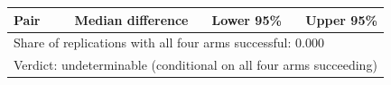 \begin{tabular}{lrrr}
\hline
Pair & Median difference & Lower 95\% & Upper 95\% \\
\hline
\hline
\multicolumn{4}{l}{Share of replications with all four arms successful: 0.000} \\
\multicolumn{4}{l}{Verdict: undeterminable (conditional on all four arms succeeding)} \\
\hline
\end{tabular}

